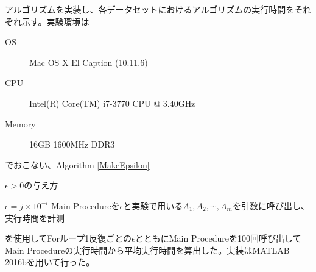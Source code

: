 アルゴリズムを実装し、各データセットにおけるアルゴリズムの実行時間をそれぞれ示す。実験環境は
\begin{description}
  \item[OS] Mac OS X El Caption (10.11.6)
  \item[CPU] Intel(R) Core(TM) i7-3770 CPU @ 3.40GHz
  \item[Memory] 16GB 1600MHz DDR3
\end{description}
でおこない、Algorithm \ref{MakeEpsilon}
\begin{algorithm}
  \caption{$\epsilon > 0$の与え方}
  \label{MakeEpsilon}
  \begin{algorithmic}
        \State $\epsilon = j \times 10^{-i}$
          \State Main Procedureを$\epsilon$と実験で用いる$A_1, A_2, \cdots, A_m$を引数に呼び出し、実行時間を計測
        \EndFor
      \EndFor
    \EndFor
  \end{algorithmic}
\end{algorithm}
を使用してForループ1反復ごとの$\epsilon$とともにMain Procedureを100回呼び出してMain Procedureの実行時間から平均実行時間を算出した。実装はMATLAB 2016bを用いて行った。

